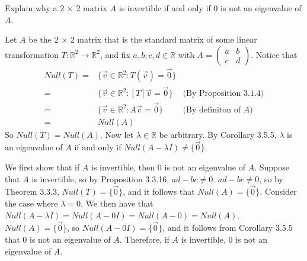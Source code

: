 \documentclass[12pt]{article}
\newenvironment{problem}[2][Problem]
{
	\begin{trivlist} 
		\item[\hskip \labelsep {\bfseries #1 #2:}]
	}
{
	\end{trivlist}
	}
\newenvironment{solution}[1][Solution]
{
	\begin{trivlist} 
		\item[\hskip \labelsep {\itshape #1:}]
	}
	{
	\end{trivlist}
}
\begin{document}
\begin{problem}{1}
Explain why a 2 $\times$ 2 matrix $A$ is invertible if and only if $0$ is not an eigenvalue of $A$.
\noindent
\newline
\newline
\begin{solution}
Let $A$ be the 2 $\times$ 2 matrix that is the standard matrix of some linear transformation $T:\mathbb{R}^2 \to \mathbb{R}^2$, and fix $a,b,c,d \in \mathbb{R}$ with $A=\begin{pmatrix}a&b\\c&d\end{pmatrix}$. Notice that
\begin{align*}
Null(T) = & \{\vec{v} \in \mathbb{R}^2 :T(\vec{v})=\vec{0}\}  &\\
=& \{\vec{v} \in \mathbb{R}^2 :[T]\vec{v}=\vec{0}\} & \text{(By Proposition 3.1.4)} \\
=& \{\vec{v} \in \mathbb{R}^2 :A\vec{v}=\vec{0}\}&\text{(By definiton of $A$)}\\
=& Null(A) &
\end{align*}
So $Null(T)=Null(A)$. Now let $\lambda \in \mathbb{R}$ be arbitrary. By Corollary 3.5.5, $\lambda$ is an eigenvalue of $A$ if and only if $Null(A-\lambda I) \neq \{\vec{0}\}$.

We first show that if $A$ is invertible, then 0 is not an eigenvalue of $A$. Suppose that $A$ is invertible, so by Proposition 3.3.16, $ad-bc \neq 0$. $ad-bc\neq0$, so by Theorem 3.3.3, $Null(T) = \{\vec{0}\}$, and it follows that $Null(A) = \{\vec{0} \}$. Consider the case where $\lambda = 0$. We then have that $Null(A-\lambda I) = Null(A-0I) = Null(A-0) = Null(A)$. $Null(A) = \{\vec{0}\}$, so $Null(A-0I) = \{\vec{0}\}$, and it follows from Corollary 3.5.5 that $0$ is not an eigenvalue of $A$. Therefore, if $A$ is invertible, 0 is not an eigenvalue of $A$.


\end{solution}
\end{problem}
\end{document}
